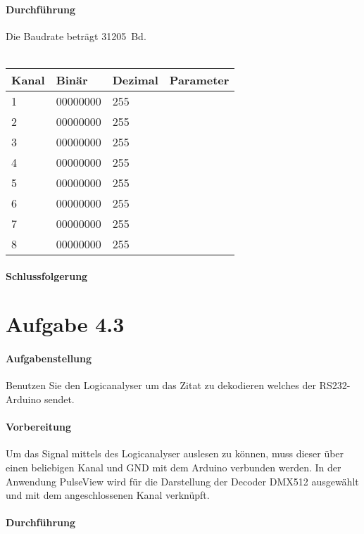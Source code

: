 \paragraph{Durchführung}
Die Baudrate beträgt \SI{31205}{Bd}.
\\\\
\begin{tabular}{|l|l|l|l|}
	\hline
	Kanal & Binär    & Dezimal & Parameter \\ \hline\hline
	1     & 00000000 & 255     &           \\ \hline
	2     & 00000000 & 255     &           \\ \hline
	3     & 00000000 & 255     &           \\ \hline
	4     & 00000000 & 255     &           \\ \hline
	5     & 00000000 & 255     &           \\ \hline
	6     & 00000000 & 255     &           \\ \hline
	7     & 00000000 & 255     &           \\ \hline
	8     & 00000000 & 255     &           \\ \hline
\end{tabular}

\paragraph{Schlussfolgerung}


\section{Aufgabe 4.3}
\paragraph{Aufgabenstellung}
Benutzen Sie den Logicanalyser um das Zitat zu dekodieren welches der RS232-Arduino sendet.

\paragraph{Vorbereitung}
Um das Signal mittels des Logicanalyser auslesen zu können, muss dieser über einen beliebigen Kanal und GND mit dem Arduino verbunden werden. In der Anwendung PulseView wird für die Darstellung der Decoder DMX512 ausgewählt und mit dem angeschlossenen Kanal verknüpft.

\paragraph{Durchführung}



